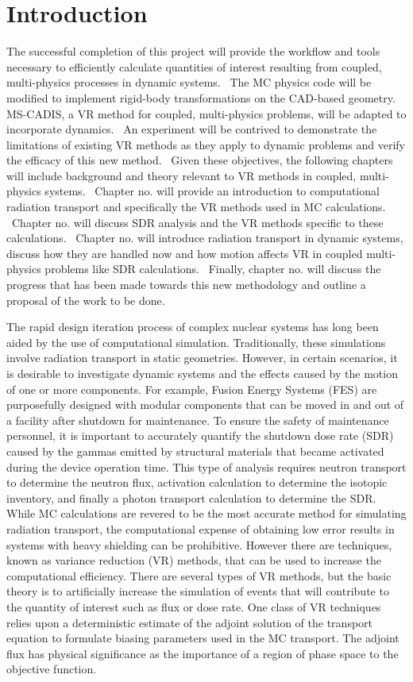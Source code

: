 \chapter{Introduction} \label{ch:intro}

The successful completion of this project will provide the workflow and tools
necessary to efficiently calculate quantities of interest resulting from
coupled, multi-physics processes in dynamic systems.  The MC physics code will
be modified to implement rigid-body transformations on the CAD-based geometry.
MS-CADIS, a VR method for coupled, multi-physics problems, will be adapted to
incorporate dynamics.  An experiment will be contrived to demonstrate the
limitations of existing VR methods as they apply to dynamic problems and verify
the efficacy of this new method.  Given these objectives, the following chapters
will include background and theory relevant to VR methods in coupled,
multi-physics systems.  Chapter no. will provide an introduction to computational
radiation transport and specifically the VR methods used in MC calculations.
 Chapter no. will discuss SDR analysis and the VR methods specific to these
calculations.  Chapter no. will introduce radiation transport in dynamic systems,
discuss how they are handled now and how motion affects VR in coupled
multi-physics problems like SDR calculations.  Finally, chapter no. will discuss
the progress that has been made towards this new methodology and outline a
proposal of the work to be done.

The rapid design iteration process of complex nuclear systems has long been
aided by the use of computational simulation.  Traditionally, these simulations
involve radiation transport in static geometries.  However, in certain
scenarios, it is desirable to investigate dynamic systems and the effects caused
by the motion of one or more components.  
For example, Fusion Energy Systems
(FES) are purposefully designed with modular components that can be moved in and
out of a facility after shutdown for maintenance.  
To ensure the safety of maintenance personnel, it is important to accurately quantify the
shutdown dose rate (SDR) caused by the gammas emitted by structural materials that became 
activated during the device operation time.  
This type of analysis requires neutron transport to determine the neutron flux,
activation calculation to determine the isotopic inventory, and finally a 
photon transport calculation to determine the SDR.
While MC calculations are revered to be the most accurate method for simulating
radiation transport, the computational expense of obtaining low error results 
in systems with heavy shielding can be prohibitive.  
However there are techniques, known as variance reduction (VR)
methods, that can be used to increase the computational efficiency.  
There are several types
of VR methods, but the basic theory is to artificially increase the simulation of
events that will contribute to the quantity of interest such as flux or dose
rate. 
 One class of VR techniques relies upon a deterministic estimate of the adjoint 
solution of the transport equation to
formulate biasing parameters used in the MC transport. 
The adjoint flux has physical significance as the importance of a region of
phase space to the objective function.

